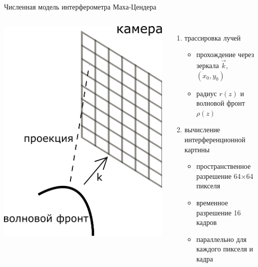 \begin{frame}{Численная модель интерферометра Маха-Цендера}
\begin{columns}
\centering
\includegraphics[width=0.8\linewidth]{images/wave_front_projection.png}
\begin{enumerate}
    \item трассировка лучей 
    \begin{itemize}
        \item прохождение через зеркала $\vec{k}$, $(x_0, y_0)$
        \item радиус $r(z)$ и волновой фронт $\rho(z)$
    \end{itemize}
    \item вычисление интерференционной картины
    \begin{itemize}
        \item пространственное разрешение 64×64 пикселя
        \item временное разрешение 16 кадров
        \item параллельно для каждого пикселя и кадра
    \end{itemize}

    
\end{enumerate}

\end{columns}
\end{frame}

